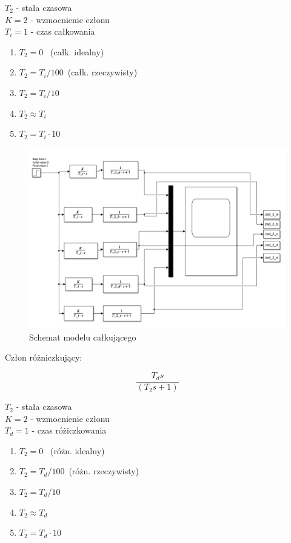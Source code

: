 \documentclass{article}
\begin{document}
$T_{2}$ - stała czasowa\\
$K=2$ - wzmocnienie członu\\
$T_{i}=1$ - czas całkowania\\
\begin{enumerate}[label=\alph*)]
\item $T_{2}=0$ \ (całk. idealny)
\item $T_{2}=T_{i}/100$\ (całk. rzeczywisty)
\item $T_{2}=T_{i}/10$
\item $T_{2} \approx T_{i}$
\item $T_{2}=T_{i}\cdot 10$
\end{enumerate}

\begin{figure}[h!]
    \centering
    \includegraphics[scale=0.6]{model_calkujacy.png}
    \caption{Schemat modelu całkującego}
    \label{fig:model_calkujacy}
\end{figure}
\newpage
\begin{flushleft}

Człon różniczkujący:
\end{flushleft}{}

$$
\frac{T_{d}s}{(T_{2}s+1)}
$$

$T_{2}$ - stała czasowa\\
$K=2$ - wzmocnienie członu\\
$T_d=1$ - czas różiczkowania\\
\begin{enumerate}[label=\alph*)]
\item $T_{2}=0$ \ (różn. idealny)
\item $T_{2}=T_{d}/100$\ (różn. rzeczywisty)
\item $T_{2}=T_{d}/10$
\item $T_{2} \approx T_{d}$
\item $T_{2}=T_{d}\cdot 10$
\end{enumerate}{}
\end{document}
